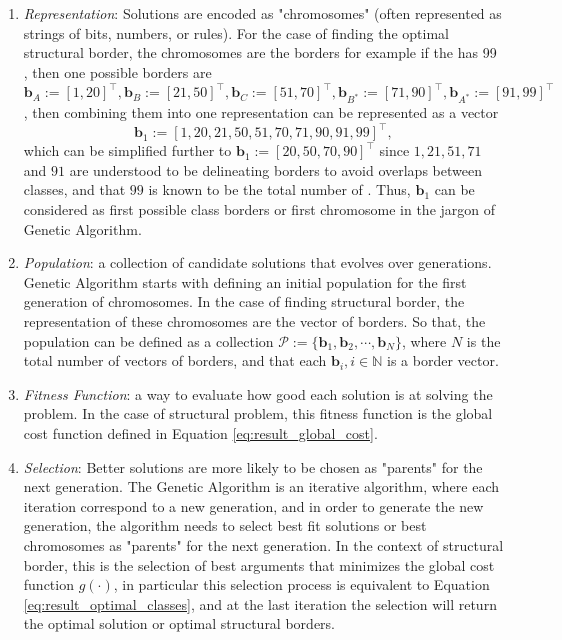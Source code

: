\begin{enumerate}
    \item \textit{Representation}: Solutions are encoded as "chromosomes" (often represented as strings of bits, numbers, or rules). For the case of finding the optimal structural border, the chromosomes are the borders for example if the   has 99  , then one possible borders are $\mathbf{b}_A:=[1, 20]^{\top}, \mathbf{b}_B:=[21,50]^{\top}, \mathbf{b}_C:=[51,70]^{\top}, \mathbf{b}_{B^*}:=[71,90]^{\top}, \mathbf{b}_{A^*}:=[91,99]^{\top}$, then combining them into one representation can be represented as a vector 
    \begin{equation}
        \mathbf{b}_{1}:=[1,20,21,50,51,70,71,90,91,99]^{\top},
    \end{equation}
    which can be simplified further to $\mathbf{b}_1:=[20,50,70,90]^{\top}$ since $1, 21,51,71$ and $91$ are understood to be delineating borders to avoid overlaps between classes, and that $99$ is known to be the total number of  . Thus, $\mathbf{b}_1$ can be considered as first possible class borders or first chromosome in the jargon of Genetic Algorithm.
    \item \textit{Population}: a collection of candidate solutions that evolves over generations. Genetic Algorithm starts with defining an initial population for the first generation of chromosomes. In the case of finding structural border, the representation of these chromosomes are the vector of borders. So that, the population can be defined as a collection $\mathscr{P}:=\{\mathbf{b}_1,\mathbf{b}_2,\cdots,\mathbf{b}_N\}$, where $N$ is the total number of vectors of borders, and that each $\mathbf{b}_i,i\in\mathbb{N}$ is a border vector.
    \item \textit{Fitness Function}: a way to evaluate how good each solution is at solving the problem. In the case of structural problem, this fitness function is the global cost function defined in Equation \ref{eq:result_global_cost}.
    \item \textit{Selection}: Better solutions are more likely to be chosen as "parents" for the next generation. The Genetic Algorithm is an iterative algorithm, where each iteration correspond to a new generation, and in order to generate the new generation, the algorithm needs to select best fit solutions or best chromosomes as "parents" for the next generation. In the context of structural border, this is the selection of best arguments that minimizes the global cost function $g(\cdot)$, in particular this selection process is equivalent to Equation \ref{eq:result_optimal_classes}, and at the last iteration the selection will return the optimal solution or optimal structural borders.

\end{enumerate}

